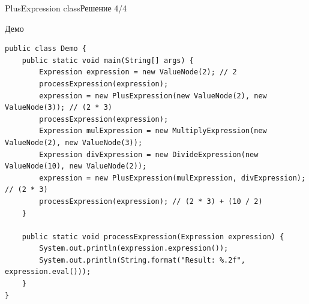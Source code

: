 \begin{frame}[fragile]{PlusExpression class}{Решение 4/4}

\end{frame}

\begin{frame}[fragile,shrink=40]{Демо}
\vspace{2cm}
\begin{lstlisting}
public class Demo {
    public static void main(String[] args) {
        Expression expression = new ValueNode(2); // 2
        processExpression(expression);
        expression = new PlusExpression(new ValueNode(2), new ValueNode(3)); // (2 * 3)
        processExpression(expression);
        Expression mulExpression = new MultiplyExpression(new ValueNode(2), new ValueNode(3));
        Expression divExpression = new DivideExpression(new ValueNode(10), new ValueNode(2));
        expression = new PlusExpression(mulExpression, divExpression); // (2 * 3)
        processExpression(expression); // (2 * 3) + (10 / 2)
    }
    
    public static void processExpression(Expression expression) {
        System.out.println(expression.expression());
        System.out.println(String.format("Result: %.2f", expression.eval()));
    }
}
\end{lstlisting}
\end{frame}

